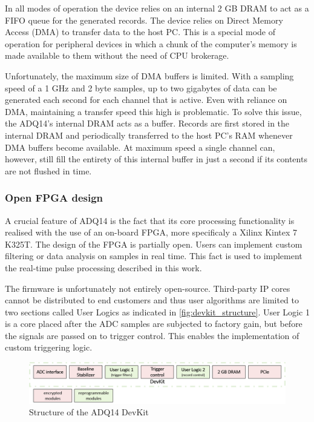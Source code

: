 In all modes of operation the device relies on an internal 2 GB DRAM
to act as a FIFO queue for the generated records.
The device relies on Direct Memory Access (DMA) to transfer
data to the host PC. This is a special mode of operation for 
peripheral devices in which a chunk of the computer's memory is
made available to them without the need of CPU brokerage.


Unfortunately, the maximum size of DMA buffers is limited. 
With a sampling speed of a 1 GHz and 2 byte samples, up 
to two gigabytes of data can be generated each second for each
channel that is active. Even with reliance on DMA, maintaining 
a transfer speed this high is problematic. To solve this issue, 
the ADQ14's internal DRAM acts as a buffer.
Records are first stored in the internal DRAM and periodically
transferred to the host PC's RAM whenever DMA buffers become available.
At maximum speed a single channel can, however, still fill the entirety
of this internal buffer in just a second if its contents are not flushed in time.

\subsubsection{Open FPGA design} \label{ssec:adq_devkit}

A crucial feature of ADQ14 is the fact that its core processing
functionality is realised with the use of an on-board FPGA,
more specificaly a Xilinx Kintex 7 K325T. The design of the FPGA
is partially open. Users can implement custom
filtering or data analysis on samples in real time.
This fact is used to implement the real-time pulse processing described in this work.


The firmware is unfortunately not entirely open-source.
Third-party IP cores cannot be distributed to end customers 
and thus user algorithms are limited to two sections called User Logics
as indicated in \autoref{fig:devkit_structure}.
User Logic 1 is a core placed after the ADC samples are subjected to factory
gain, but before the signals are passed on to trigger control.
This enables the implementation of custom triggering logic.

\begin{figure}[H]
  \centering
  \includegraphics[width=\linewidth]{media/devkit_structure.png}
  \caption{Structure of the ADQ14 DevKit}
  \label{fig:devkit_structure} 
\end{figure}


